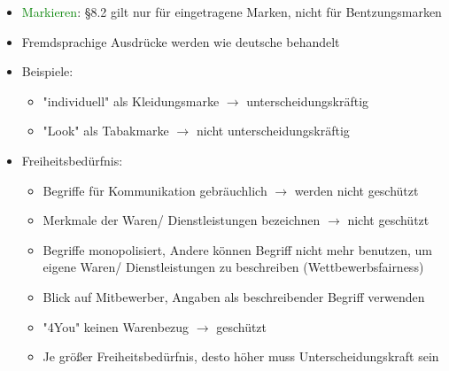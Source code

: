 \documentclass{report}
\begin{document}
\begin{itemize}
\begin{itemize}
\begin{itemize}
			\item \textcolor{green}{Markieren}: §8.2 gilt nur für eingetragene Marken, nicht für Bentzungsmarken
			\item Fremdsprachige Ausdrücke werden wie deutsche behandelt
			\item Beispiele:
			\begin{itemize}
				\item "individuell" als Kleidungsmarke $\rightarrow$ unterscheidungskräftig
				\item "Look" als Tabakmarke $\rightarrow$ nicht unterscheidungskräftig
			\end{itemize}
			\item Freiheitsbedürfnis:
			\begin{itemize}
				\item Begriffe für Kommunikation gebräuchlich $\rightarrow$ werden nicht geschützt
				\item Merkmale der Waren/ Dienstleistungen bezeichnen $\rightarrow$ nicht geschützt
				\item Begriffe monopolisiert, Andere können Begriff nicht mehr benutzen, um eigene Waren/ Dienstleistungen zu beschreiben (Wettbewerbsfairness)
				\item Blick auf Mitbewerber, Angaben als beschreibender Begriff verwenden
				\item "4You" keinen Warenbezug $\rightarrow$ geschützt
				\item Je größer Freiheitsbedürfnis, desto höher muss Unterscheidungskraft sein
			\end{itemize}
		\end{itemize}
	\end{itemize}
\end{itemize}
\end{document}
